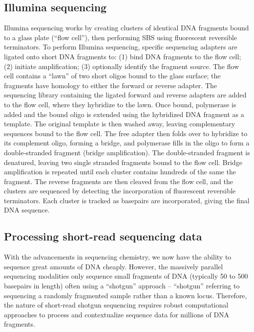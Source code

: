 \documentclass[11pt,letterpaper]{book}
\begin{document}
\hypertarget{illumina}{%
\subsection{Illumina sequencing}\label{illumina}}

Illumina sequencing works by creating clusters of identical DNA fragments bound to a glass plate (``flow cell''), then performing SBS using fluorescent reversible terminators.
To perform Illumina sequencing, specific sequencing adapters are ligated onto short DNA fragments to: (1) bind DNA fragments to the flow cell; (2) initiate amplification; (3) optionally identify the fragment source.
The flow cell contains a ``lawn'' of two short oligos bound to the glass surface; the fragments have homology to either the forward or reverse adapter.
The sequencing library containing the ligated forward and reverse adapters are added to the flow cell, where they hybridize to the lawn.
Once bound, polymerase is added and the bound oligo is extended using the hybridized DNA fragment as a template.
The original template is then washed away, leaving complementary sequences bound to the flow cell.
The free adapter then folds over to hybridize to its complement oligo, forming a bridge, and polymerase fills in the oligo to form a double-stranded fragment (bridge amplification).
The double-stranded fragment is denatured, leaving two single stranded fragments bound to the flow cell.
Bridge amplification is repeated until each cluster contains hundreds of the same the fragment.
The reverse fragments are then cleaved from the flow cell, and the clusters are sequenced by detecting the incorporation of fluorescent reversible terminators.
Each cluster is tracked as basepairs are incorporated, giving the final DNA sequence.

\hypertarget{seqData}{%
\subsection{Processing short-read sequencing data}\label{seqData}}

With the advancements in sequencing chemistry, we now have the ability to sequence great amounts of DNA cheaply.
However, the massively parallel sequencing modalities only sequence small fragments of DNA (typically 50 to 500 basepairs in length) often using a ``shotgun'' approach -- ``shotgun'' referring to sequencing a randomly fragmented sample rather than a known locus.
Therefore, the nature of short-read shotgun sequencing requires robust computational approaches to process and contextualize sequence data for millions of DNA fragments.
\end{document}
